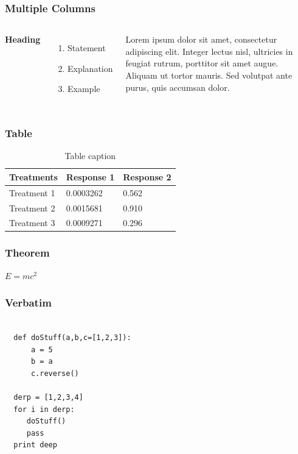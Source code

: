 \documentclass{beamer}
\begin{document}

\begin{frame}
  \frametitle{Multiple Columns}

  \begin{columns}[c] %

    \textbf{Heading}
    \begin{enumerate}
    \item Statement
    \item Explanation
    \item Example
    \end{enumerate}

    Lorem ipsum dolor sit amet, consectetur adipiscing elit. Integer
    lectus nisl, ultricies in feugiat rutrum, porttitor sit amet
    augue. Aliquam ut tortor mauris. Sed volutpat ante purus, quis
    accumsan dolor.

  \end{columns}
\end{frame}


\begin{frame}
\frametitle{Table}
\begin{table}
\begin{tabular}{l l l}
\toprule
\textbf{Treatments} & \textbf{Response 1} & \textbf{Response 2}\\
\midrule
Treatment 1 & 0.0003262 & 0.562 \\
Treatment 2 & 0.0015681 & 0.910 \\
Treatment 3 & 0.0009271 & 0.296 \\
\bottomrule
\end{tabular}
\caption{Table caption}
\end{table}
\end{frame}


\begin{frame}
\frametitle{Theorem}
\begin{theorem}
$E = mc^2$
\end{theorem}
\end{frame}



\begin{frame}[fragile] %
\frametitle{Verbatim}
\begin{example}
\begin{verbatim}

  def doStuff(a,b,c=[1,2,3]):
      a = 5
      b = a 
      c.reverse()
  
  derp = [1,2,3,4]
  for i in derp:
     doStuff()
     pass
  print deep

\end{verbatim}
\end{example}
\end{frame}
\end{document}
